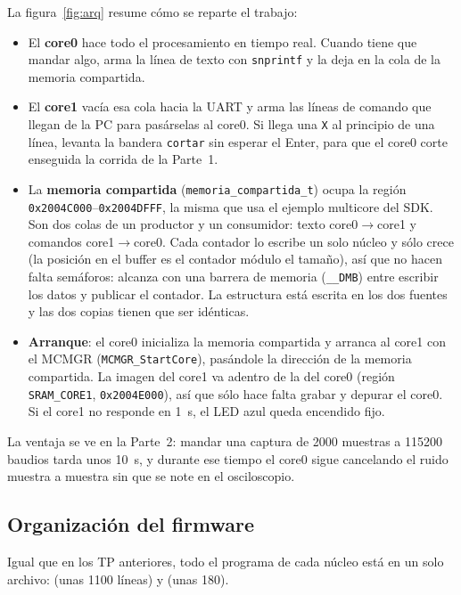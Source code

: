 \documentclass[11pt,a4paper]{article}
\begin{document}
La figura~\ref{fig:arq} resume cómo se reparte el trabajo:
\begin{itemize}
  \item El \textbf{core0} hace todo el procesamiento en tiempo real. Cuando tiene que mandar
  algo, arma la línea de texto con \texttt{snprintf} y la deja en la cola de la memoria
  compartida.
  \item El \textbf{core1} vacía esa cola hacia la UART y arma las líneas de comando que llegan de la
  PC para pasárselas al core0. Si llega una \texttt{X} al principio de una línea, levanta la bandera
  \texttt{cortar} sin esperar el Enter, para que el core0 corte enseguida la corrida de la
  Parte~1.
  \item La \textbf{memoria compartida} (\texttt{memoria\_compartida\_t}) ocupa la región
  \texttt{0x2004C000}--\texttt{0x2004DFFF}, la misma que usa el ejemplo multicore del SDK. Son dos
  colas de un productor y un consumidor: texto core0$\to$core1 y comandos core1$\to$core0. Cada
  contador lo escribe un solo núcleo y sólo crece (la posición en el buffer es el contador
  módulo el tamaño), así que no hacen falta semáforos: alcanza con una barrera de memoria
  (\texttt{\_\_DMB}) entre escribir los datos y publicar el contador. La estructura está escrita
  en los dos fuentes y las dos copias tienen que ser idénticas.
  \item \textbf{Arranque}: el core0 inicializa la memoria compartida y arranca al core1 con el
  MCMGR (\texttt{MCMGR\_StartCore}), pasándole la dirección de la memoria compartida. La imagen
  del core1 va adentro de la del core0 (región \texttt{SRAM\_CORE1}, \texttt{0x2004E000}), así
  que sólo hace falta grabar y depurar el core0. Si el core1 no responde en 1~s, el LED azul queda
  encendido fijo.
\end{itemize}

La ventaja se ve en la Parte~2: mandar una captura de 2000 muestras a 115200 baudios tarda unos
10~s, y durante ese tiempo el core0 sigue cancelando el ruido muestra a muestra sin que se note
en el osciloscopio.

\subsection{Organización del firmware}
Igual que en los TP anteriores, todo el programa de cada núcleo está en un solo archivo:
 (unas 1100 líneas) y  (unas 180).
\end{document}

